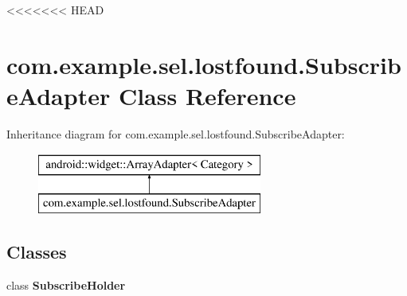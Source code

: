 <<<<<<< HEAD
\hypertarget{classcom_1_1example_1_1sel_1_1lostfound_1_1SubscribeAdapter}{\section{com.\-example.\-sel.\-lostfound.\-Subscribe\-Adapter Class Reference}
\label{classcom_1_1example_1_1sel_1_1lostfound_1_1SubscribeAdapter}
}
Inheritance diagram for com.\-example.\-sel.\-lostfound.\-Subscribe\-Adapter\-:\begin{figure}[H]
\begin{center}
\leavevmode
\includegraphics[height=2.000000cm]{classcom_1_1example_1_1sel_1_1lostfound_1_1SubscribeAdapter}
\end{center}
\end{figure}
\subsection*{Classes}
\begin{DoxyCompactItemize}
\item 
class {\bfseries Subscribe\-Holder}
\end{DoxyCompactItemize}
